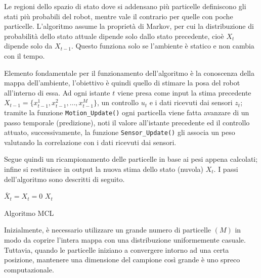 \bigskip



Le regioni dello spazio di stato dove si addensano più particelle definiscono gli stati più probabili del robot, mentre vale il contrario per quelle con poche particelle. L’algoritmo assume la proprietà di Markov, per cui la distribuzione di probabilità dello stato attuale dipende solo dallo stato precedente, cioè $X_t$ dipende solo da $X_{t-1}$. 
Questo funziona solo se l’ambiente è statico e non cambia con il tempo. 

\bigskip

Elemento fondamentale per il funzionamento dell'algoritmo è la conoscenza della mappa dell’ambiente, l’obiettivo è quindi quello di stimare la posa del robot all'interno di essa.
Ad ogni istante $t$ viene presa come input la stima precedente $X_{t-1} = \{x_{t-1}^{1},x_{t-1}^{2},\dots,x_{t-1}^{M}\}$, un controllo $u_t$ e i dati ricevuti dai sensori $z_t$; tramite la funzione \texttt{Motion\_Update()} ogni particella viene fatta avanzare di un passo temporale (predizione), noti il valore all'istante precedente ed il controllo attuato, successivamente, la funzione \texttt{Sensor\_Update()} gli associa un peso valutando la correlazione con i dati ricevuti dai sensori.

Segue quindi un ricampionamento delle particelle in base ai pesi appena calcolati; infine si restituisce in output la nuova stima dello stato (nuvola) $X_t$. I passi dell'algoritmo sono  descritti di seguito.

\bigskip
\bigskip

\begin{algorithm}[H]
\SetAlgoLined
{}
\BlankLine
{}
\BlankLine
 $\bar{X}_{t}=X_{t}=0$\;
 \Return $X_{t}$
 \BlankLine
 \caption{Algoritmo MCL}
 \label{MCL}
\end{algorithm}

\bigskip
\bigskip

Inizialmente, è necessario utilizzare un grande numero di particelle $(M)$ in modo da coprire l’intera mappa con una distribuzione uniformemente casuale. Tuttavia, quando le particelle iniziano a convergere intorno ad una certa posizione, mantenere una dimensione del campione così grande è uno spreco computazionale.

